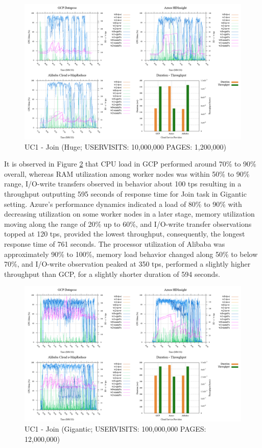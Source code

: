 \documentclass[review]{elsarticle}
\begin{document}
\begin{figure}[p]
	\caption{UC1 - Join (Huge; USERVISITS: 10,000,000 PAGES: 1,200,000)}
	\label{fig:uc1-join-h-cmidt}
	\includegraphics[width=\textwidth]{uc1-join-h-cmidt}
	\centering
\end{figure}

It is observed in Figure \ref{fig:uc1-join-g-cmidt} that CPU load in GCP performed around 70\% to 90\% overall, whereas RAM utilization among worker nodes was within 50\% to 90\% range, I/O-write transfers observed in behavior about 100 tps resulting in a throughput outputting 595 seconds of response time for Join task in Gigantic setting. Azure's performance dynamics indicated a load of 80\% to 90\% with decreasing utilization on some worker nodes in a later stage, memory utilization moving along the range of 20\% up to 60\%, and I/O-write transfer observations topped at 120 tps, provided the lowest throughput, consequently, the longest response time of 761 seconds.  The processor utilization of Alibaba was approximately 90\% to 100\%, memory load behavior changed along 50\% to below 70\%, and I/O-write observation peaked at 350 tps, performed a slightly higher throughput than GCP, for a slightly shorter duration of 594 seconds.

\begin{figure}[p]
	\caption{UC1 - Join (Gigantic; USERVISITS: 100,000,000 PAGES: 12,000,000)}
	\label{fig:uc1-join-g-cmidt}
	\includegraphics[width=\textwidth]{uc1-join-g-cmidt}
	\centering
\end{figure}
\end{document}

